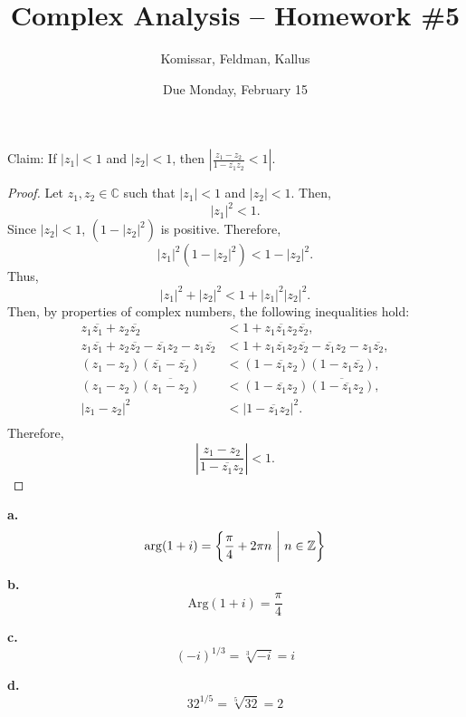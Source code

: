 \documentclass[11pt]{article}       %
\title{Complex Analysis -- Homework \#5}
\author{ Komissar, Feldman, Kallus }
\date{ Due Monday, February 15 }
\theoremstyle{definition}
\begin{document}
\pagecolor{black}
\color{white}
\maketitle

 Claim: If $|z_1| < 1$ and $|z_2| < 1$, then $\left| \frac{z_1 - z_2}{1 - \overline{z_1}z_2} < 1 \right|$.
\begin{proof}
    Let $z_1, z_2 \in \mathbb C$ such that $|z_1| < 1$ and $|z_2| < 1$.
    Then, $$|z_1|^2 < 1.$$
    Since $|z_2| < 1$, $(1-|z_2|^2)$ is positive.
    Therefore, $$|z_1|^2(1-|z_2|^2) < 1 - |z_2|^2.$$
    Thus, $$|z_1|^2 + |z_2|^2 < 1 + |z_1|^2|z_2|^2.$$
    Then, by properties of complex numbers, the following inequalities hold:
    \begin{align*}
    z_1\overline{z_1} + z_2\overline{z_2} &< 1 + z_1\overline{z_1}z_2\overline{z_2}, \\
    z_1\overline{z_1} + z_2\overline{z_2} - \overline{z_1}z_2 - z_1\overline{z_2} &< 1 + z_1\overline{z_1}z_2\overline{z_2} - \overline{z_1}z_2 - z_1\overline{z_2}, \\
    (z_1 - z_2)(\overline{z_1} - \overline{z_2}) &< (1 - \overline{z_1}z_2)(1 - z_1\overline{z_2}), \\
    (z_1 - z_2)\overline{(z_1 - z_2)} &< (1 - \overline{z_1}z_2)\overline{(1 - \overline{z_1}z_2)}, \\
    |z_1 - z_2|^2 &< |1-\overline{z_1}z_2|^2. \\
    \end{align*}
    Therefore, $$\left|\frac{z_1 - z_2}{1-\overline{z_1}z_2}\right| < 1.$$
\end{proof}

\bigskip
{}

{\bf a.} $$\arg(1+i) = \left\{\frac{\pi}4 + 2\pi n ~\bigg{|}~ n \in \mathbb Z\right\}$$

{\bf b.} $$\text{Arg}(1+i) = \frac{\pi}4$$

{\bf c.} $$(-i)^{1/3} = \sqrt[3]{-i} = i$$

{\bf d.} $$32^{1/5} = \sqrt[5]{32} = 2$$
\end{document}
